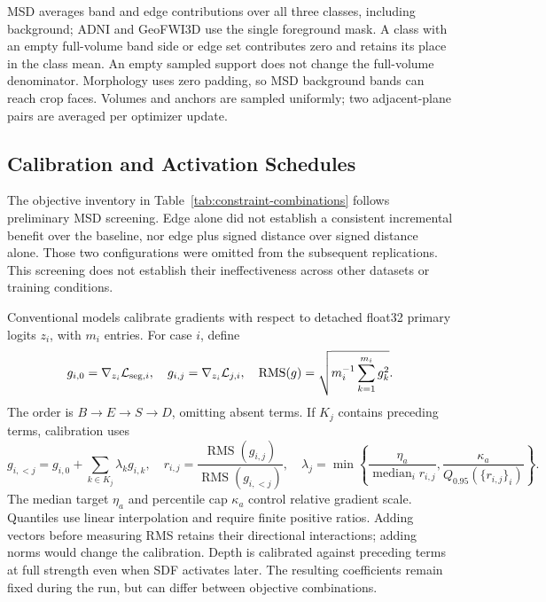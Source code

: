 \documentclass[12pt,a4paper]{article}
\begin{document}
MSD averages band and edge contributions over all three classes,
including background; ADNI and GeoFWI3D use the single foreground
mask. A class with an empty full-volume band side or edge set contributes
zero and retains its place in the class mean. An empty sampled support
does not change the full-volume denominator. Morphology uses zero
padding, so MSD background bands can reach crop faces. Volumes and
anchors are sampled uniformly; two adjacent-plane pairs are averaged
per optimizer update.

\subsection{Calibration and Activation Schedules}
\label{sec:detailed-calibration}\label{sec:calibration-methods}

The objective inventory in Table~\ref{tab:constraint-combinations} follows
preliminary MSD screening. Edge alone did not establish a consistent
incremental benefit over the baseline, nor edge plus signed distance
over signed distance alone. Those two configurations were omitted from
the subsequent replications. This screening does not establish their
ineffectiveness across other datasets or training conditions.


Conventional models calibrate gradients with respect to detached
float32 primary logits $z_i$, with $m_i$ entries. For case $i$, define
\begin{equation}
g_{i,0}=\nabla_{z_i}\mathcal L_{{\rm seg},i},\quad
g_{i,j}=\nabla_{z_i}\mathcal L_{j,i},\quad
\operatorname{RMS}(g)=\sqrt{m_i^{-1}\sum_{k=1}^{m_i}g_k^2}.
\label{eq:calibration-logit-gradients}
\end{equation}
The order is $B\to E\to S\to D$, omitting absent terms. If $K_j$
contains preceding terms, calibration uses
\begin{equation}
g_{i,<j}=g_{i,0}+\sum_{k\in K_j}\lambda_k g_{i,k},\quad
r_{i,j}=\frac{\operatorname{RMS}(g_{i,j})}{\operatorname{RMS}(g_{i,<j})},\quad
\lambda_j=\min\left\{\frac{\eta_a}{\operatorname{median}_i r_{i,j}},
\frac{\kappa_a}{Q_{0.95}(\{r_{i,j}\}_i)}\right\}.
\label{eq:constraint-calibrated-coefficient}
\end{equation}
The median target $\eta_a$ and percentile cap $\kappa_a$ control relative
gradient scale. Quantiles use linear interpolation and require finite
positive ratios. Adding vectors before measuring RMS retains their
directional interactions; adding norms would change the calibration.
Depth is calibrated against preceding terms at full strength even when
SDF activates later. The resulting coefficients remain fixed during the
run, but can differ between objective combinations.
\end{document}

